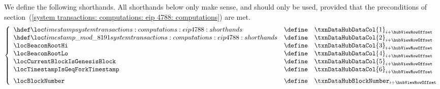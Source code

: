 We define the following shorthands.
All shorthands below only make sense, and should only be used, provided that the preconditions of
section~(\ref{system transactions: computations: eip 4788: computations})
are met.
\[
	\left\{ \begin{array}{lcl}
		\locLineaTimestamp              & \define & \txnDataHubDataCol {1} _{i + \hubViewRowOffset}              \\
		\locLineaTimestampModuloPrime   & \define & \txnDataHubDataCol {2} _{i + \hubViewRowOffset}              \\
		\locBeaconRootHi                & \define & \txnDataHubDataCol {3} _{i + \hubViewRowOffset}              \\
		\locBeaconRootLo                & \define & \txnDataHubDataCol {4} _{i + \hubViewRowOffset}              \\
		\locCurrentBlockIsGenesisBlock  & \define & \txnDataHubDataCol {5} _{i + \hubViewRowOffset}              \\
		\locTimestampIsGeqForkTimestamp & \define & \txnDataHubDataCol {6} _{i + \hubViewRowOffset} \vspace{2mm} \\
		\locBlockNumber                 & \define & \txnDataHubBlockNumber _{i + \hubViewRowOffset}              \\
	\end{array} \right.
\]
